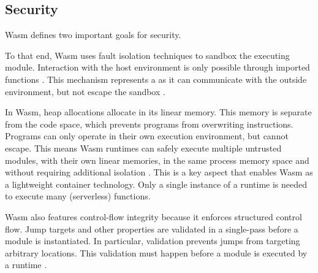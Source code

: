 


\subsection{Security}


Wasm defines two important goals for security.

\begin{quote}
\end{quote}

To that end, Wasm uses fault isolation techniques to sandbox the executing module. Interaction with the host environment is only possible through imported functions \cite{W3C2020}. This mechanism represents a  as it can communicate with the outside environment, but not escape the sandbox \cite{Haas2017}.

In Wasm, heap allocations allocate in its linear memory. This memory is separate from the code space, which prevents programs from overwriting instructions. Programs can only operate in their own execution environment, but cannot escape. This means Wasm runtimes can safely execute multiple untrusted modules, with their own linear memories, in the same process memory space and without requiring additional isolation \cite{Haas2017}. This is a key aspect that enables Wasm as a lightweight container technology. Only a single instance of a runtime is needed to execute many (serverless) functions.

Wasm also features control-flow integrity because it enforces structured control flow. Jump targets and other properties are validated in a single-pass before a module is instantiated. In particular, validation prevents jumps from targeting arbitrary locations. This validation must happen before a module is executed by a runtime \cite{Haas2017}.

